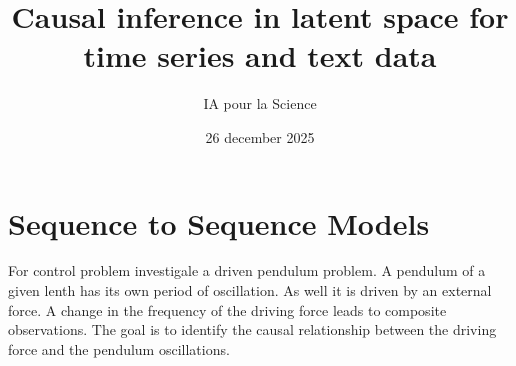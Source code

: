 \documentclass[12pt]{article}
\title{Causal inference in latent space for time series and text data}
\author{IA pour la Science}
\date{26 december 2025}
\begin{document}
\maketitle

\section{Sequence to Sequence Models}

    For control problem investigale a driven pendulum problem. A pendulum of a given lenth has its own period of oscillation.
    As well it is driven by an external force. A change in the frequency of the driving force leads to composite observations.
    The goal is to identify the causal relationship between the driving force and the pendulum oscillations.
\end{document}
